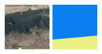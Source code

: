 \begin{figure}
    \newcommand{\UnetPredictionsImageWidth}{0.18\textwidth}
    \centering

    \includegraphics[width=\UnetPredictionsImageWidth]{images/unet/82607-image} \hfill
    \includegraphics[width=\UnetPredictionsImageWidth]{images/unet/82607-label} \hfill

\end{figure}
